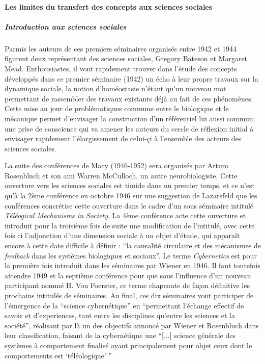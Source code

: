 \paragraph{ Les limites du transfert des concepts aux sciences sociales}

\subparagraph{Introduction aux sciences sociales}
Parmis les auteurs de ces premiers séminaires organisés entre 1942 et 1944 figurent deux représentant des sciences sociales, Gregory Bateson et Margaret Mead. Enthousiastes, il vont rapidement trouver dans l'étude des concepts développés dans ce premier séminaire (1942) un écho à leur propre travaux sur la dynamique sociale, la notion d'homéostasie n'étant qu'un nouveau mot permettant de rassembler des travaux existants déjà au fait de ces phénomènes. Cette mise au jour de problématiques commune entre le biologique et le mécanique permet d'envisager la construction d'un référentiel lui aussi commun; une prise de conscience qui va amener les auteurs du cercle de réflexion initial à envisager rapidement l'élargissement de celui-çi à l'ensemble des acteurs des sciences sociales.

La suite des conférences de Macy (1946-1952) sera organisés par Arturo Rosenbluch et son ami Warren McCulloch, un autre neurobiologiste. Cette ouverture vers les sciences sociales est timide dans un premier temps, et ce n'est qu'à la 2ème conférence en octobre 1946 sur une suggestion de Lazarsfeld que les conférences concrétise cette ouverture dans le cadre d'un sous séminaire intitulé \textit{Téléogical Mechanisms in Society}. La 4ème conférence acte cette ouverture et introduit pour la troisième fois de suite une modification de l'intitulé, avec cette fois ci l'adjonction d'une dimension sociale à un objet d'étude, qui apparaît encore à cette date difficile à définir : \enquote{la causalité circulaire et des mécanismes de \textit{feedback} dans les systèmes biologiques et sociaux}. Le terme \textit{Cybernetics} est pour la première fois introduit dans les séminaires par Wiener en 1946. Il faut toutefois attendre 1949 et la septième conférence pour que sous l'influence d'un nouveau participant nommé H. Von Foerster, ce terme chapeaute de façon définitive les prochains intitulés de séminaires. Au final, ces dix séminaires vont participer de l'émergence de la \enquote{science cybernétique} en \enquote{permettant l'échange effectif de savoir et d'experiences, tant entre les disciplines qu'entre les sciences et la société}, réalisant par là un des objectifs annoncé par Wiener et Rosenbluch dans leur classification, faisant de la cybernétique une \enquote{[...] science générale des systèmes à comportement finalisé ayant principalement pour objet ceux dont le comportements est \enquote{téléologique} } \autocite{Pouvreau2013}

